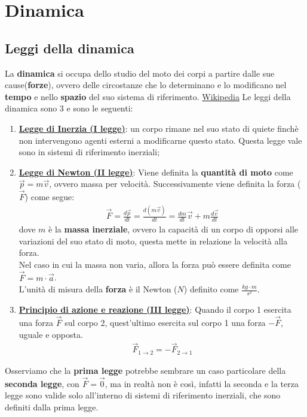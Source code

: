 \section{Dinamica}
    \subsection{Leggi della dinamica}
        La \textbf{dinamica} si occupa dello studio del moto dei corpi a partire dalle sue cause(\textbf{forze}), ovvero delle circostanze che lo determinano e lo modificano nel \textbf{tempo} e nello \textbf{spazio} del suo sistema di riferimento. \href{https://it.wikipedia.org/wiki/Dinamica}{Wikipedia}
        Le leggi della dinamica sono 3 e sono le seguenti:
        \begin{enumerate}
            \item \underline{\textbf{Legge di Inerzia (I legge)}}: un corpo rimane nel suo stato di quiete finchè non intervengono agenti esterni a modificarne questo stato. Questa legge vale sono in sistemi di riferimento inerziali;\\
            \item \underline{\textbf{Legge di Newton (II legge)}}: \label{II_legge_dinamica}
            Viene definita la \textbf{quantità di moto} come $\vec{p}=m\vec{v}$, ovvero massa per velocità. Successivamente viene definita la forza ($\vec{F}$) come segue:
            \begin{align*}
                \vec{F}=\frac{d\vec{p}}{dt}=\frac{d(m\vec{v})}{dt}=\frac{dm}{dt}\vec{v} + m\frac{d\vec{v}}{dt}
            \end{align*}
            dove $m$ è la \textbf{massa inerziale}, ovvero la capacità di un corpo di opporsi alle variazioni del suo stato di moto, questa mette in relazione la velocità alla forza.\\
            Nel caso in cui la massa non varia, allora la forza può essere definita come $\vec{F}=m\cdot\vec{a}$.\\
            L'unità di misura della \textbf{forza} è il Newton ($N$) definito come $\frac{kg\cdot m}{s^2}$.\\
            \item \underline{\textbf{Principio di azione e reazione (III legge)}}: Quando il corpo 1 esercita una forza $\vec{F}$ sul corpo 2, quest'ultimo esercita sul corpo 1 una forza $-\vec{F}$, uguale e opposta.
            \begin{align*}
                \vec{F}_{1\rightarrow 2}=-\vec{F}_{2\rightarrow 1}
            \end{align*}
        \end{enumerate}
        Osserviamo che la \textbf{prima legge} potrebbe sembrare un caso particolare della \textbf{seconda legge}, con $\vec{F}=\vec{0}$, ma in realtà non è così, infatti la seconda e la terza legge sono valide solo all'interno di sistemi di riferimento inerziali, che sono definiti dalla prima legge.

